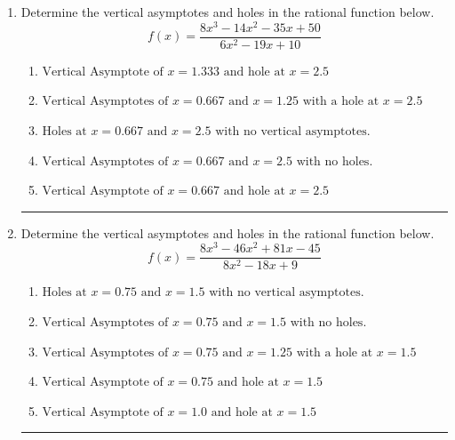 \documentclass[14pt]{extbook}
\newcommand{\litem}[1]{\item#1\hspace*{-1cm}\rule{\textwidth}{0.4pt}}
\begin{document}
\begin{enumerate}
{\begin{enumerate}[label=\Alph*.]
\end{enumerate} }
\litem{
Determine the vertical asymptotes and holes in the rational function below.\[ f(x) = \frac{8x^{3} -14 x^{2} -35 x + 50}{6x^{2} -19 x + 10} \]\begin{enumerate}[label=\Alph*.]
\item \( \text{Vertical Asymptote of } x = 1.333 \text{ and hole at } x = 2.5 \)
\item \( \text{Vertical Asymptotes of } x = 0.667 \text{ and } x = 1.25 \text{ with a hole at } x = 2.5 \)
\item \( \text{Holes at } x = 0.667 \text{ and } x = 2.5 \text{ with no vertical asymptotes.} \)
\item \( \text{Vertical Asymptotes of } x = 0.667 \text{ and } x = 2.5 \text{ with no holes.} \)
\item \( \text{Vertical Asymptote of } x = 0.667 \text{ and hole at } x = 2.5 \)

\end{enumerate} }
\litem{
Determine the vertical asymptotes and holes in the rational function below.\[ f(x) = \frac{8x^{3} -46 x^{2} +81 x -45}{8x^{2} -18 x + 9} \]\begin{enumerate}[label=\Alph*.]
\item \( \text{Holes at } x = 0.75 \text{ and } x = 1.5 \text{ with no vertical asymptotes.} \)
\item \( \text{Vertical Asymptotes of } x = 0.75 \text{ and } x = 1.5 \text{ with no holes.} \)
\item \( \text{Vertical Asymptotes of } x = 0.75 \text{ and } x = 1.25 \text{ with a hole at } x = 1.5 \)
\item \( \text{Vertical Asymptote of } x = 0.75 \text{ and hole at } x = 1.5 \)
\item \( \text{Vertical Asymptote of } x = 1.0 \text{ and hole at } x = 1.5 \)


\end{enumerate}}
\end{enumerate}
\end{document}
